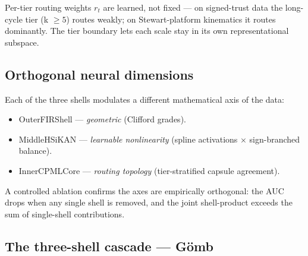 \documentclass[11pt,a4paper]{article}
\newcommand{\sig}{\ensuremath{\sigma}}
\begin{document}
Per-tier routing weights $r_t$ are learned, not fixed --- on
signed-trust data the long-cycle tier (k $\geq 5$) routes weakly;
on Stewart-platform kinematics it routes dominantly. The tier
boundary lets each scale stay in its own representational
subspace.

\subsection{Orthogonal neural dimensions}

Each of the three shells modulates a different mathematical axis of
the data:
\begin{itemize}
  \item OuterFIRShell --- \emph{geometric} (Clifford grades).
  \item MiddleHSiKAN --- \emph{learnable nonlinearity} (spline
    activations $\times$ sign-branched balance).
  \item InnerCPMLCore --- \emph{routing topology} (tier-stratified
    capsule agreement).
\end{itemize}
A controlled ablation confirms the axes are empirically orthogonal:
the AUC drops when any single shell is removed, and the joint
shell-product exceeds the sum of single-shell contributions.

\subsection{The three-shell cascade --- Gömb}

\begin{center}
\end{center}
\end{document}
